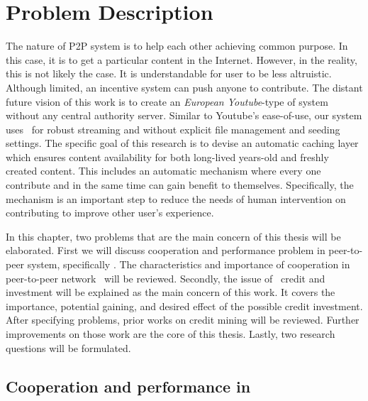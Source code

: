\chapter{Problem Description}
\label{chp:relwork}
The nature of P2P system is to help each other achieving common purpose. In this case, it is to get a particular content in the Internet. However, in the reality, this is not likely the case. It is understandable for user to be less altruistic. Although limited, an incentive system can push anyone to contribute. The distant future vision of this work is to create an \textit{European Youtube}-type of system without any central authority server. Similar to Youtube's ease-of-use, our system uses \bt~for robust streaming and without explicit file management and seeding settings. The specific goal of this research is to devise an automatic caching layer which ensures content availability for both long-lived years-old and freshly created content. This includes an automatic mechanism where every one contribute and in the same time can gain benefit to themselves. Specifically, the mechanism is an important step to reduce the needs of human intervention on contributing to improve other user's experience.

In this chapter, two problems that are the main concern of this thesis will be elaborated. First we will discuss cooperation and performance problem in peer-to-peer system, specifically \bt. The characteristics and importance of cooperation in peer-to-peer network \bt~will be reviewed. Secondly, the issue of \bt~credit and investment will be explained as the main concern of this work. It covers the importance, potential gaining, and desired effect of the possible credit investment. After specifying problems, prior works on credit mining will be reviewed. Further improvements on those work are the core of this thesis. Lastly, two research questions will be formulated.

\section{Cooperation and performance in \bt}

